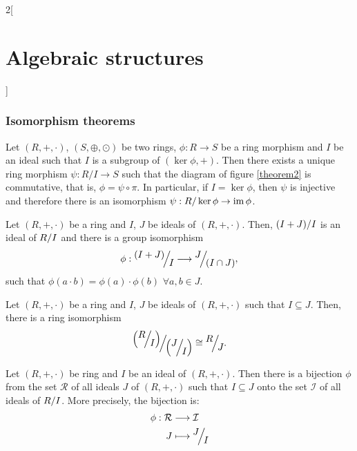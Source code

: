 \documentclass[../../../main.tex]{subfiles}
\begin{document}
\begin{multicols}{2}[\section{Algebraic structures}]
\subsubsection{Isomorphism theorems}
\begin{theorem}
    Let $(R,+,\cdot)$, $(S,\oplus,\odot)$ be two rings, $\phi:R\rightarrow S$ be a ring morphism and $I$ be an ideal such that $I$ is a subgroup of $(\ker\phi,+)$. Then there exists a unique ring morphism $\psi:R/I\rightarrow S$ such that the diagram of figure \ref{theorem2} is commutative, that is, $\phi=\psi\circ\pi$.
    In particular, if $I=\ker\phi$, then $\psi$ is injective and therefore there is an isomorphism $\psi:R/\ker\phi\rightarrow\operatorname{im}\phi$.
\end{theorem}
\begin{theorem}
    Let $(R,+,\cdot)$ be a ring and $I$, $J$ be ideals of $(R,+,\cdot)$. Then, $\quot{(I+J)}{I}$ is an ideal of $\quot{R}{I}$ and there is a group isomorphism 
    $$\phi:\quot{(I+J)}{I}\longrightarrow\quot{J}{(I\cap J)},$$ such that $\phi(a\cdot b)=\phi(a)\cdot\phi(b)$ $\forall a,b\in J$.
\end{theorem}
\begin{theorem}
    Let $(R,+,\cdot)$ be a ring and $I$, $J$ be ideals of $(R,+,\cdot)$ such that $I\subseteq J$. Then, there is a ring isomorphism 
    $$\quot{\left(\quot{R}{I}\right)}{\left(\quot{J}{I}\right)}\cong\quot{R}{J}.$$
\end{theorem}
\begin{theorem}
    Let $(R,+,\cdot)$ be ring and $I$ be an ideal of $(R,+,\cdot)$. Then there is a bijection $\phi$ from the set $\mathcal{R}$ of all ideals $J$ of $(R,+,\cdot)$ such that $I\subseteq J$ onto the set $\mathcal{I}$ of all ideals of $\quot{R}{I}$. More precisely, the bijection is:
    \begin{align*}
        \phi:\mathcal{R}&\longrightarrow\mathcal{I}\\
        J&\longmapsto\quot{J}{I}
    \end{align*}
\end{theorem}

\end{multicols}
\end{document}
